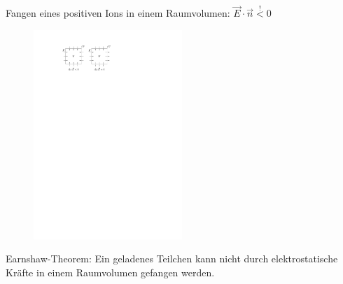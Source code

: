 \documentclass[12pt]{beamer}
\begin{document}
\begin{frame}
	Fangen eines positiven Ions in einem Raumvolumen: $\vec{E} \cdot \vec{n} \stackrel{!}{<} 0$
	\begin{figure}
		\centering
		\includegraphics*[width=0.5\textwidth]{./figures/earnshaw.pdf}
	\end{figure}
		\begin{block}{Earnshaw-Theorem:}
			Ein geladenes Teilchen kann nicht durch elektrostatische Kräfte in einem Raumvolumen gefangen werden.
		\end{block}
\end{frame}
\end{document}
